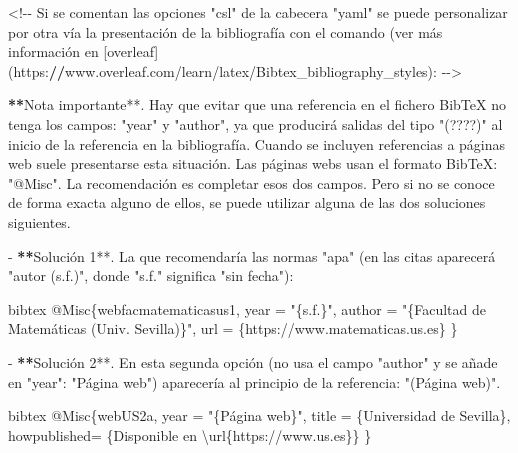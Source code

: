 \documentclass[11pt,a4paper,oneside,]{article}
\newenvironment{Shaded}{\begin{snugshade}}{\end{snugshade}}
\newcommand{\AttributeTok}[1]{\textcolor[rgb]{0.77,0.63,0.00}{#1}}
\newcommand{\DecValTok}[1]{\textcolor[rgb]{0.00,0.00,0.81}{#1}}
\newcommand{\ErrorTok}[1]{\textcolor[rgb]{0.64,0.00,0.00}{\textbf{#1}}}
\newcommand{\FunctionTok}[1]{\textcolor[rgb]{0.00,0.00,0.00}{#1}}
\newcommand{\NormalTok}[1]{#1}
\newcommand{\OtherTok}[1]{\textcolor[rgb]{0.56,0.35,0.01}{#1}}
\newcommand{\SpecialCharTok}[1]{\textcolor[rgb]{0.00,0.00,0.00}{#1}}
\newcommand{\StringTok}[1]{\textcolor[rgb]{0.31,0.60,0.02}{#1}}
\numberwithin{dummy}{section}
\theoremstyle{ocrenumbox}
\theoremstyle{blacknumex}
\theoremstyle{blacknumbox}
\theoremstyle{ocrenum}
\theoremstyle{ocrenum}
\begin{document}
\begin{Shaded}
\begin{Highlighting}[numbers=left,,firstnumber=1101,]
\SpecialCharTok{\textless{}!{-}{-}}\NormalTok{ Si se comentan las opciones }\StringTok{"csl"}\NormalTok{ de la cabecera }\StringTok{"yaml"}\NormalTok{ se puede personalizar por otra vía la presentación de la bibliografía con el }\FunctionTok{comando}\NormalTok{ (ver más información en [overleaf](https}\SpecialCharTok{:}\ErrorTok{//}\NormalTok{www.overleaf.com}\SpecialCharTok{/}\NormalTok{learn}\SpecialCharTok{/}\NormalTok{latex}\SpecialCharTok{/}\NormalTok{Bibtex\_bibliography\_styles)}\SpecialCharTok{:} \SpecialCharTok{{-}}\OtherTok{{-}\textgreater{}}

\ErrorTok{**}\NormalTok{Nota importante}\SpecialCharTok{**}\NormalTok{. Hay que evitar que una referencia en el fichero BibTeX no tenga los campos}\SpecialCharTok{:} \StringTok{"year"}\NormalTok{ y }\StringTok{"author"}\NormalTok{, ya que producirá salidas del tipo }\StringTok{"(????)"}\NormalTok{ al inicio de la referencia en la bibliografía. Cuando se incluyen referencias a páginas web suele presentarse esta situación. Las páginas webs usan el formato BibTeX}\SpecialCharTok{:} \StringTok{"\textasciigrave{}@Misc\textasciigrave{}"}\NormalTok{. La recomendación es completar esos dos campos. Pero si no se conoce de forma exacta alguno de ellos, se puede utilizar alguna de las dos soluciones siguientes.}

\SpecialCharTok{{-}} \ErrorTok{**}\NormalTok{Solución }\DecValTok{1}\SpecialCharTok{**}\NormalTok{. La que recomendaría las normas }\StringTok{"apa"}\NormalTok{ (en las citas aparecerá }\StringTok{"autor (s.f.)"}\NormalTok{, donde }\StringTok{"s.f."}\NormalTok{ significa }\StringTok{"sin fecha"}\NormalTok{)}\SpecialCharTok{:}

\StringTok{\textasciigrave{}\textasciigrave{}\textasciigrave{}}\AttributeTok{bibtex}
\AttributeTok{@Misc\{webfacmatematicasus1,}
\AttributeTok{  year = "\{s.f.\}",}
\AttributeTok{  author = "\{Facultad de Matemáticas (Univ. Sevilla)\}",}
\AttributeTok{  url = \{https://www.matematicas.us.es\}}
\AttributeTok{\} }
\StringTok{\textasciigrave{}\textasciigrave{}\textasciigrave{}}


\SpecialCharTok{{-}} \ErrorTok{**}\NormalTok{Solución }\DecValTok{2}\SpecialCharTok{**}\NormalTok{. En esta segunda opción (no usa el campo }\StringTok{"author"}\NormalTok{ y se añade en }\StringTok{"year"}\SpecialCharTok{:} \StringTok{"Página web"}\NormalTok{) aparecería al principio de la referencia}\SpecialCharTok{:} \StringTok{"(Página web)"}\NormalTok{.}

\StringTok{\textasciigrave{}\textasciigrave{}\textasciigrave{}}\AttributeTok{bibtex}
\AttributeTok{@Misc\{webUS2a,}
\AttributeTok{  year = "\{Página web\}",}
\AttributeTok{  title = \{Universidad de Sevilla\},}
\AttributeTok{  howpublished= \{Disponible en \textbackslash{}url\{https://www.us.es\}\}}
\AttributeTok{\}}


\end{Highlighting}
\end{Shaded}
\end{document}
